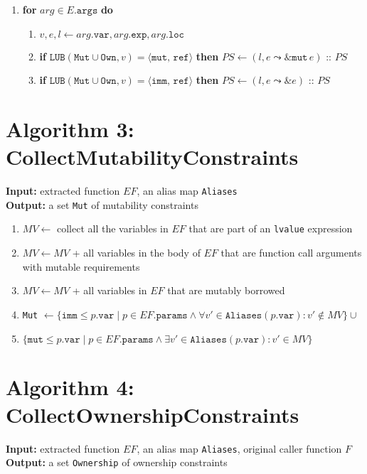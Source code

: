 \documentclass{article}
\begin{document}
\begin{enumerate}
    \item \textbf{for} $arg \in E.\texttt{args}$ \textbf{do}
    \begin{enumerate}
        \item $v, e, l \leftarrow arg.\texttt{var}, arg.\texttt{exp}, arg.\texttt{loc}$
        \item \textbf{if} $\texttt{LUB}(\texttt{Mut} \cup \texttt{Own}, v) = \langle \texttt{mut, ref} \rangle$ \textbf{then} $PS \leftarrow (l, e \leadsto \&\texttt{mut} \, e)$ :: $PS$
        \item \textbf{if} $\texttt{LUB}(\texttt{Mut} \cup \texttt{Own}, v) = \langle \texttt{imm, ref} \rangle$ \textbf{then} $PS \leftarrow (l, e \leadsto \&e)$ :: $PS$
    \end{enumerate}
\end{enumerate}

\newpage

\section{Algorithm 3: CollectMutabilityConstraints}
\textbf{Input:} extracted function $EF$, an alias map \texttt{Aliases} \\
\textbf{Output:} a set \texttt{Mut} of mutability constraints

\begin{enumerate}
    \item $MV \leftarrow$ collect all the variables in $EF$ that are part of an \texttt{lvalue} expression
    \item $MV \leftarrow MV$ + all variables in the body of $EF$ that are function call arguments with mutable requirements
    \item $MV \leftarrow MV$ + all variables in $EF$ that are mutably borrowed
    \item \texttt{Mut} $\leftarrow \{ \texttt{imm} \leq p.\texttt{var} \mid p \in EF.\texttt{params} \land \forall v' \in \texttt{Aliases}(p.\texttt{var}) : v' \notin MV \} \cup$
    \item \quad $\{ \texttt{mut} \leq p.\texttt{var} \mid p \in EF.\texttt{params} \land \exists v' \in \texttt{Aliases}(p.\texttt{var}) : v' \in MV \}$
\end{enumerate}

\newpage

\section{Algorithm 4: CollectOwnershipConstraints}
\textbf{Input:} extracted function $EF$, an alias map \texttt{Aliases}, original caller function $F$ \\
\textbf{Output:} a set \texttt{Ownership} of ownership constraints
\end{document}

